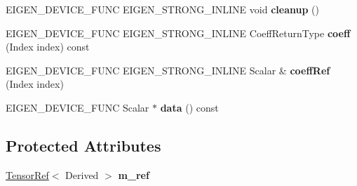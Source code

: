 \begin{DoxyCompactItemize}
\item 
\mbox{\label{struct_eigen_1_1_tensor_evaluator_3_01const_01_tensor_ref_3_01_derived_01_4_00_01_device_01_4_aacc7160fed84bb1a69032b15c49c8aa9}} 
E\+I\+G\+E\+N\+\_\+\+D\+E\+V\+I\+C\+E\+\_\+\+F\+U\+NC E\+I\+G\+E\+N\+\_\+\+S\+T\+R\+O\+N\+G\+\_\+\+I\+N\+L\+I\+NE void {\bfseries cleanup} ()
\item 
\mbox{\label{struct_eigen_1_1_tensor_evaluator_3_01const_01_tensor_ref_3_01_derived_01_4_00_01_device_01_4_a6475ac3c31557f7ccb668347328547ab}} 
E\+I\+G\+E\+N\+\_\+\+D\+E\+V\+I\+C\+E\+\_\+\+F\+U\+NC E\+I\+G\+E\+N\+\_\+\+S\+T\+R\+O\+N\+G\+\_\+\+I\+N\+L\+I\+NE Coeff\+Return\+Type {\bfseries coeff} (Index index) const
\item 
\mbox{\label{struct_eigen_1_1_tensor_evaluator_3_01const_01_tensor_ref_3_01_derived_01_4_00_01_device_01_4_a3a3e17ef6adcd5bc3f02a2ccd02d4dfe}} 
E\+I\+G\+E\+N\+\_\+\+D\+E\+V\+I\+C\+E\+\_\+\+F\+U\+NC E\+I\+G\+E\+N\+\_\+\+S\+T\+R\+O\+N\+G\+\_\+\+I\+N\+L\+I\+NE Scalar \& {\bfseries coeff\+Ref} (Index index)
\item 
\mbox{\label{struct_eigen_1_1_tensor_evaluator_3_01const_01_tensor_ref_3_01_derived_01_4_00_01_device_01_4_aa0c4a9617a7dc87d1898107d36c6b7ea}} 
E\+I\+G\+E\+N\+\_\+\+D\+E\+V\+I\+C\+E\+\_\+\+F\+U\+NC Scalar $\ast$ {\bfseries data} () const
\end{DoxyCompactItemize}
\subsection*{Protected Attributes}
\begin{DoxyCompactItemize}
\item 
\mbox{\label{struct_eigen_1_1_tensor_evaluator_3_01const_01_tensor_ref_3_01_derived_01_4_00_01_device_01_4_a4fb8d354a59f0feb3605a43b486f212f}} 
\hyperlink{class_eigen_1_1_tensor_ref}{Tensor\+Ref}$<$ Derived $>$ {\bfseries m\+\_\+ref}
\end{DoxyCompactItemize}


